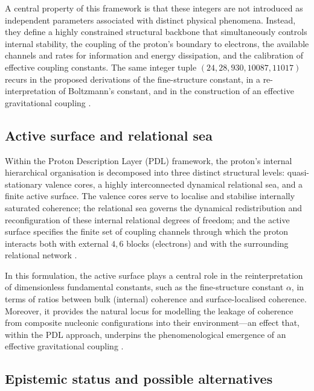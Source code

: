 \documentclass{article}
\begin{document}
A central property of this framework is that these integers are not introduced as independent parameters associated with distinct physical phenomena. Instead, they define a highly constrained structural backbone that simultaneously controls internal stability, the coupling of the proton’s boundary to electrons, the available channels and rates for information and energy dissipation, and the calibration of effective coupling constants. The same integer tuple \((24,28,930,10087,11017)\) recurs in the proposed derivations of the fine-structure constant, in a re-interpretation of Boltzmann’s constant, and in the construction of an effective gravitational coupling \citep{PDL_intro,Alpha_PDL_v2_2026,Born_Golden_v2_2026}.

\subsection{Active surface and relational sea}
\label{subsec:active_surface}

Within the Proton Description Layer (PDL) framework, the proton’s internal hierarchical organisation is decomposed into three distinct structural levels: quasi-stationary valence cores, a highly interconnected dynamical relational sea, and a finite active surface. The valence cores serve to localise and stabilise internally saturated coherence; the relational sea governs the dynamical redistribution and reconfiguration of these internal relational degrees of freedom; and the active surface specifies the finite set of coupling channels through which the proton interacts both with external \(4,6\) blocks (electrons) and with the surrounding relational network
\citep{PDL_Main_2026,Born_Golden_v2_2026}.

In this formulation, the active surface plays a central role in the reinterpretation of dimensionless fundamental constants, such as the fine-structure constant \(\alpha\), in terms of ratios between bulk (internal) coherence and surface-localised coherence. Moreover, it provides the natural locus for modelling the leakage of coherence from composite nucleonic configurations into their environment—an effect that, within the PDL approach, underpins the phenomenological emergence of an effective gravitational coupling
\citep{Alpha_PDL_v2_2026,Exponent_18_PDL_2026}.

\subsection{Epistemic status and possible alternatives}
\label{subsec:proton_status}
\end{document}
